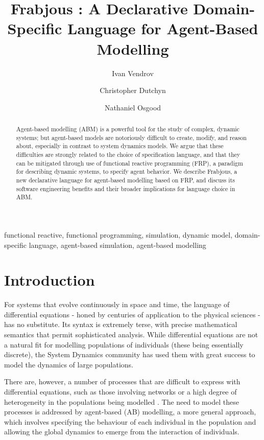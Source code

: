 \documentclass{llncs}
\begin{document}
\lstset{language=Haskell}
%

\title{Frabjous : A Declarative Domain-Specific Language for Agent-Based Modelling}

\author{Ivan Vendrov \and Christopher Dutchyn \and Nathaniel Osgood}

\maketitle

\begin{abstract}
Agent-based modelling (ABM) is a powerful tool for the study of complex, dynamic systems; but agent-based models are notoriously difficult to create, modify, and reason about, especially in contrast to system dynamics models. We argue that these difficulties are strongly related to the choice of specification language, and that they can be mitigated through use of functional reactive programming (FRP), a paradigm for describing dynamic systems, to specify agent behavior. We describe Frabjous, a new declarative language for agent-based modelling based on FRP, and discuss its software engineering benefits and their broader implications for language choice in ABM. 
\end{abstract}

\keywords
functional reactive, functional programming, simulation, dynamic model, domain-specific language, agent-based simulation, agent-based modelling

\section{Introduction}

For systems that evolve continuously in space and time, the language of differential equations - honed by centuries of application to the physical sciences - has no substitute. Its syntax is extremely terse, with precise mathematical semantics that permit sophisticated analysis. While differential equations are not a natural fit for modelling populations of individuals (these being essentially discrete), the System Dynamics community has used them with great success to model the dynamics of large populations. 

  There are, however,  a number of processes that are difficult to express with differential equations, such as those involving networks or a high degree of heterogeneity in the populations being modelled \cite{system_dyn_tradeoffs}. The need to model these processes is addressed by agent-based (AB) modelling, a more general approach, which involves specifying the behaviour of each individual in the population and allowing the global dynamics to emerge from the interaction of individuals. 
  
\end{document}
